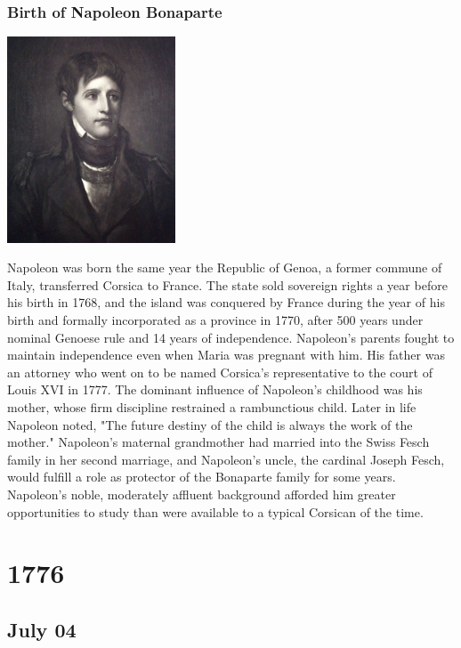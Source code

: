 \documentclass[11pt]{report}
\begin{document}
\subsection{Birth of Napoleon Bonaparte}
\vspace{2mm}\begin{center}\includegraphics[width=5cm]{./img/youngBonaparte.jpg}\end{center}
Napoleon was born the same year the Republic of Genoa, a former commune of Italy, transferred Corsica to France. The state sold sovereign rights a year before his birth in 1768, and the island was conquered by France during the year of his birth and formally incorporated as a province in 1770, after 500 years under nominal Genoese rule and 14 years of independence. Napoleon's parents fought to maintain independence even when Maria was pregnant with him. His father was an attorney who went on to be named Corsica's representative to the court of Louis XVI in 1777. The dominant influence of Napoleon's childhood was his mother, whose firm discipline restrained a rambunctious child.
Later in life Napoleon noted, "The future destiny of the child is always the work of the mother." Napoleon's maternal grandmother had married into the Swiss Fesch family in her second marriage, and Napoleon's uncle, the cardinal Joseph Fesch, would fulfill a role as protector of the Bonaparte family for some years. Napoleon's noble, moderately affluent background afforded him greater opportunities to study than were available to a typical Corsican of the time.

\chapter{1776}
\section{July 04}
\end{document}
